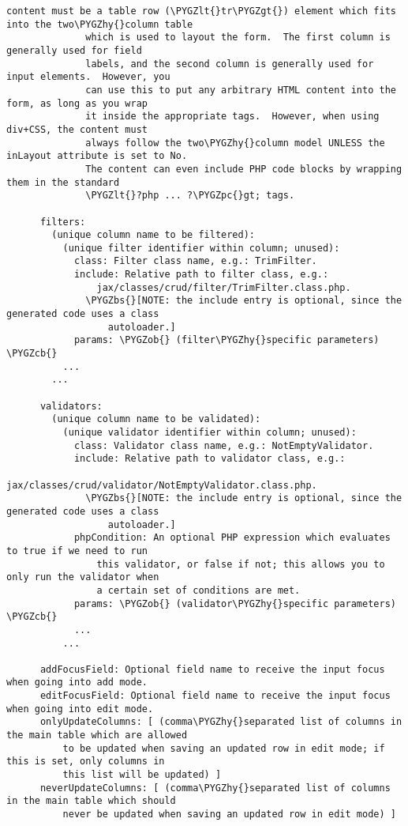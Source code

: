\documentclass[letterpaper,10pt,english]{sphinxmanual}
\def\PYGZbs{\char`\\}
\def\PYGZob{\char`\{}
\def\PYGZcb{\char`\}}
\def\PYGZlt{\char`\<}
\def\PYGZgt{\char`\>}
\def\PYGZpc{\char`\%}
\def\PYGZhy{\char`\-}
\begin{document}
\begin{Verbatim}[commandchars=\\\{\}]
              content must be a table row (\PYGZlt{}tr\PYGZgt{}) element which fits into the two\PYGZhy{}column table
              which is used to layout the form.  The first column is generally used for field
              labels, and the second column is generally used for input elements.  However, you
              can use this to put any arbitrary HTML content into the form, as long as you wrap
              it inside the appropriate tags.  However, when using div+CSS, the content must
              always follow the two\PYGZhy{}column model UNLESS the inLayout attribute is set to No.
              The content can even include PHP code blocks by wrapping them in the standard
              \PYGZlt{}?php ... ?\PYGZpc{}gt; tags.

      filters:
        (unique column name to be filtered):
          (unique filter identifier within column; unused):
            class: Filter class name, e.g.: TrimFilter.
            include: Relative path to filter class, e.g.:
                jax/classes/crud/filter/TrimFilter.class.php.
              \PYGZbs{}[NOTE: the include entry is optional, since the generated code uses a class
                  autoloader.]
            params: \PYGZob{} (filter\PYGZhy{}specific parameters) \PYGZcb{}
          ...
        ...

      validators:
        (unique column name to be validated):
          (unique validator identifier within column; unused):
            class: Validator class name, e.g.: NotEmptyValidator.
            include: Relative path to validator class, e.g.:
                jax/classes/crud/validator/NotEmptyValidator.class.php.
              \PYGZbs{}[NOTE: the include entry is optional, since the generated code uses a class
                  autoloader.]
            phpCondition: An optional PHP expression which evaluates to true if we need to run
                this validator, or false if not; this allows you to only run the validator when
                a certain set of conditions are met.
            params: \PYGZob{} (validator\PYGZhy{}specific parameters) \PYGZcb{}
            ...
          ...

      addFocusField: Optional field name to receive the input focus when going into add mode.
      editFocusField: Optional field name to receive the input focus when going into edit mode.
      onlyUpdateColumns: [ (comma\PYGZhy{}separated list of columns in the main table which are allowed
          to be updated when saving an updated row in edit mode; if this is set, only columns in
          this list will be updated) ]
      neverUpdateColumns: [ (comma\PYGZhy{}separated list of columns in the main table which should
          never be updated when saving an updated row in edit mode) ]
\end{Verbatim}
\end{document}
